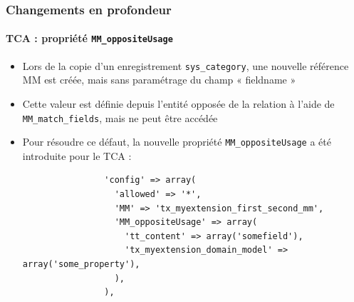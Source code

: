 \begin{frame}[fragile]
	\frametitle{Changements en profondeur}
	\framesubtitle{TCA : propriété \texttt{MM\_oppositeUsage}}

	\lstset{
		basicstyle=\tiny\ttfamily
	}

	\begin{itemize}
		\item Lors de la copie d'un enregistrement \texttt{sys\_category}, une nouvelle référence MM est créée, mais sans paramétrage du champ « fieldname »
		\item Cette valeur est définie depuis l'entité opposée de la relation à l'aide de \texttt{MM\_match\_fields}, mais ne peut être accédée
		\item Pour résoudre ce défaut, la nouvelle propriété \texttt{MM\_oppositeUsage} a été introduite pour le TCA :

			\begin{lstlisting}
				'config' => array(
				  'allowed' => '*',
				  'MM' => 'tx_myextension_first_second_mm',
				  'MM_oppositeUsage' => array(
				    'tt_content' => array('somefield'),
				    'tx_myextension_domain_model' => array('some_property'),
				  ),
				),
			\end{lstlisting}

	\end{itemize}

\end{frame}


